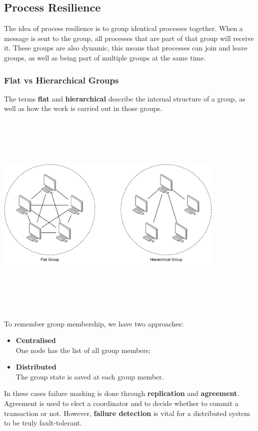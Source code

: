 \documentclass{article}
\begin{document}
\subsection{Process Resilience}
The idea of process resilience is to group identical processes together. When a message is sent to the group, all processes that are part of that group will receive it. These groups are also dynamic, this means that processes can join and leave groups, as well as being part of multiple groups at the same time.

\subsubsection{Flat vs Hierarchical Groups}
The terms \textbf{flat} and \textbf{hierarchical} describe the internal structure of a group, as well as how the work is carried out in those groups.
\begin{center}
	\includegraphics[width=11cm, height=10cm, keepaspectratio]{assets/flat-hierarchical.pdf}
\end{center}
To remember group membership, we have two approaches:
\begin{itemize}
	\item \textbf{Centralised} \\
	One node has the list of all group members;
	\item \textbf{Distributed} \\
	The group state is saved at each group member.
\end{itemize}
In these cases failure masking is done through \textbf{replication} and \textbf{agreement}. Agreement is used to elect a coordinator and to decide whether to commit a transaction or not. However, \textbf{failure detection} is vital for a distributed system to be truly fault-tolerant.
\end{document}
